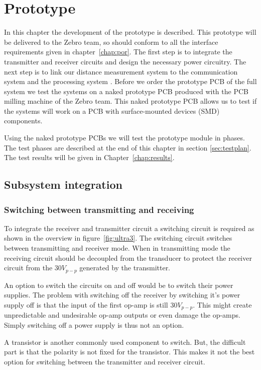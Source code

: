 \chapter{Prototype}
In this chapter the development of the prototype is described.
This prototype will be delivered to the Zebro team, so should conform to all the interface requirements given in chapter~\ref{chap:por}.
The first step is to integrate the transmitter and receiver circuits and design the necessary power circuitry.
The next step is to link our distance measurement system to the communication system \cite{communication} and the processing system \cite{processing}.
Before we order the prototype PCB of the full system we test the systems on a naked prototype PCB produced with the PCB milling machine of the Zebro team.
This naked prototype PCB allows us to test if the systems will work on a PCB with surface-mounted devices (SMD) components.

Using the naked prototype PCBs we will test the prototype module in phases.
The test phases are described at the end of this chapter in section \ref{sec:testplan}.
The test results will be given in Chapter~\ref{chap:results}.

\section{Subsystem integration}

\subsection*{Switching between transmitting and receiving}

To integrate the receiver and transmitter circuit a switching circuit is required as shown in the overview in figure~\ref{fig:ultra3}.
The switching circuit switches between transmitting and receiver mode.
When in transmitting mode the receiving circuit should be decoupled from the transducer to protect the receiver circuit from the $30V_{p-p}$ generated by the transmitter.

An option to switch the circuits on and off would be to switch their power supplies.
The problem with switching off the receiver by switching it's power supply off is that the input of the first op-amp is still $30V_{p-p}$.
This might create unpredictable and undesirable op-amp outputs or even damage the op-amps.
Simply switching off a power supply is thus not an option.

A transistor is another commonly used component to switch. But, the difficult part is that the polarity is not fixed for the transistor. This makes it not the best option for switching between the transmitter and receiver circuit.

